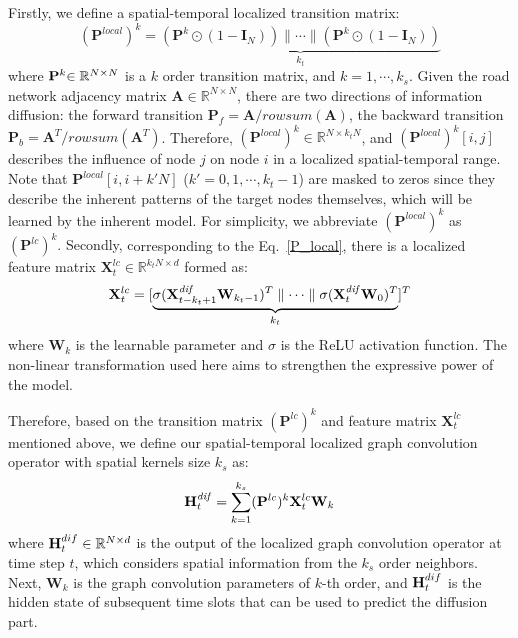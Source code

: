 \documentclass[sigconf, nonacm]{acmart}
\def\bb#1{\mathbb{#1}}
\def\b#1{\mathbf{#1}}
\begin{document}
{\color{black}Firstly, we define} a spatial-temporal localized transition matrix:
{
\begin{equation}
    (\mathbf{P}^{\mathit{local}})^k=\underbrace{(\mathbf{P}^k\odot(1-\mathbf{I}_N))\parallel \cdots \parallel (\mathbf{P}^k\odot(1-\mathbf{I}_N))}_{k_t}
\label{P_local}
\end{equation}}where $\b{P}^k{\color{black}\in\mathbb{R}^{N\times N}}$ is a $k$ order transition matrix, and $k=1,\cdots,k_s$.
{\color{black}
Given the road network adjacency matrix $\mathbf{A}\in\mathbb{R}^{N\times N}$,} there are two directions of information diffusion: the forward transition $\b{P}_f=\b{A}/rowsum(\b{A})$, the backward transition $\b{P}_b=\b{A}^T/rowsum(\mathbf{A}^T)$.
Therefore, $(\mathbf{P}^{\mathit{local}})^k\in\bb{R}^{N\times k_tN}$, and $(\mathbf{P}^{\mathit{local}})^k[i,j]$ describes the influence of node $j$ on node $i$ in a localized spatial-temporal range.
Note that $\b{P}^{\mathit{local}}[i,i+k'N]$ ($k'=0,1,\cdots,k_t-1$) {\color{black} are masked to} zeros since they describe the inherent patterns of the target nodes themselves, which will be learned by the {\color{black}inherent} model.
For simplicity, we abbreviate $(\b{P}^{\mathit{local}})^{k}$ as {\color{black}$(\b{P}^{lc})^k$.
Secondly, c}orresponding to the Eq.~\ref{P_local}, there is a localized feature matrix {\color{black}$\b{X}^{lc}_t\in\bb{R}^{k_tN\times d}$  formed as}:
{\begin{equation}
\mathbf{X}^{lc}_t=[\underbrace{\sigma(\mathbf{X}_{t-k_t+1}^{{\color{black}\mathit{dif}}}\mathbf{W}_{k_t-1})^T\parallel\cdots\parallel\sigma(\mathbf{X}_t^{{\color{black}\mathit{dif}}}\mathbf{W}_{0})^T}_{k_t}]^T
    \label{local_feat}
\end{equation}}where $\b{W}_k$ is the learnable parameter and $\sigma$ is the ReLU activation function. The non-linear transformation used here aims to strengthen the expressive power of the model.

{\color{black}Therefore,} based on the {\color{black} transition matrix $(\mathbf{P}^{lc})^k$ and feature matrix $\mathbf{X}^{lc}_t$} mentioned above, we define our spatial-temporal localized graph convolution operator with spatial kernels size $k_s$ as:
\begin{equation}
\mathbf{H}_{t}^{{\color{black}\mathit{dif}}}=\sum_{k=1}^{k_s}(\mathbf{P}^{lc})^k\mathbf{X}^{lc}_t\mathbf{W}_k
    \label{ks}
\end{equation}
where $\b{H}_t^{\color{black}dif}\in\bb{R}^{N\times d}$ is the output of the localized graph convolution operator at time step $t$, which considers spatial information from the $k_s$ order neighbors.
Next, $\b{W}_k$ is the graph convolution parameters of $k$-th order, and $\b{H}_t^{\color{black}dif}$ is the hidden state of subsequent time slots that can be used to predict the {\color{black}diffusion part}.
\end{document}
